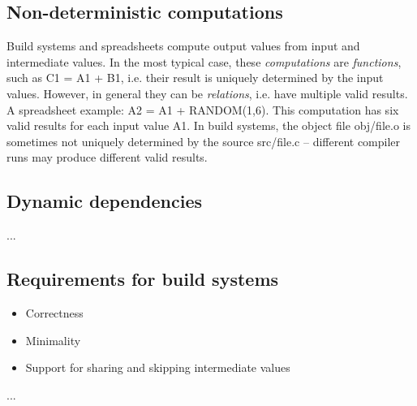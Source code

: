 \subsection{Non-deterministic computations}

Build systems and spreadsheets compute output values from input and intermediate
values. In the most typical case, these \emph{computations} are \emph{functions},
such as \textsf{C1 = A1 + B1}, i.e. their result is uniquely determined by the
input values. However, in general they can be \emph{relations}, i.e. have
multiple valid results. A spreadsheet example: \textsf{A2 = A1 + RANDOM(1,6)}.
This computation has six valid results for each input value \textsf{A1}. In
build systems, the object file \textsf{obj/file.o} is sometimes not uniquely
determined by the source \textsf{src/file.c} -- different compiler runs may
produce different valid results.

\subsection{Dynamic dependencies}

...


\subsection{Requirements for build systems}

\begin{itemize}
    \item Correctness
    \item Minimality
    \item Support for sharing and skipping intermediate values
\end{itemize}
...
